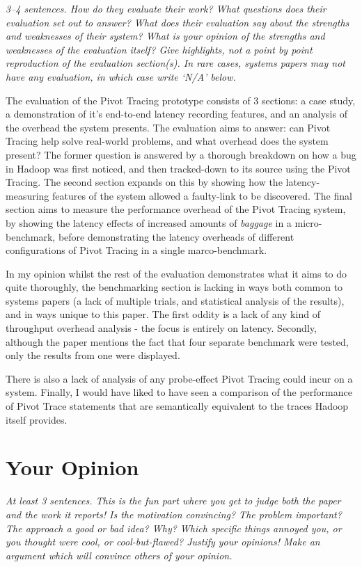 \documentclass[11pt]{article}
\begin{document}
\textsl{3--4 sentences. How do they evaluate their work? What questions does
their evaluation set out to answer? What does their evaluation say about the
strengths and weaknesses of their system? What is your opinion of the strengths
and weaknesses of the evaluation itself? Give highlights, not a point by point
reproduction of the evaluation section(s). In rare cases, systems papers may
not have any evaluation, in which case write `N/A' below.}

The evaluation of the Pivot Tracing prototype consists of 3 sections: a case
study, a demonstration of it's end-to-end latency recording features, and an
analysis of the overhead the system presents. The evaluation aims to answer:
can Pivot Tracing help solve real-world problems, and what overhead does the
system present? The former question is answered by a thorough breakdown on how
a bug in Hadoop was first noticed, and then tracked-down to its source using
the Pivot Tracing. The second section expands on this by showing how the
latency-measuring features of the system allowed a faulty-link to be
discovered. The final section aims to measure the performance overhead of the
Pivot Tracing system, by showing the latency effects of increased amounts of
\textit{baggage} in a micro-benchmark, before demonstrating the latency
overheads of different configurations of Pivot Tracing in a single
marco-benchmark.

In my opinion whilst the rest of the evaluation demonstrates what it aims to do
quite thoroughly, the benchmarking section is lacking in ways both common to
systems papers (a lack of multiple trials, and statistical analysis of the
results), and in ways unique to this paper. The first oddity is a lack of any
kind of throughput overhead analysis - the focus is entirely on latency. Secondly,
although the paper mentions the fact that four separate benchmark were tested,
only the results from one were displayed.

There is also a lack of analysis of any probe-effect Pivot Tracing could incur
on a system. Finally, I would have liked to have seen a comparison of the
performance of Pivot Trace statements that are semantically equivalent to the
traces Hadoop itself provides.


\section*{Your Opinion}

\textsl{At least 3 sentences. This is the fun part where you get to judge both
the paper and the work it reports! Is the motivation convincing? The problem
important? The approach a good or bad idea? Why? Which specific things annoyed
you, or you thought were cool, or cool-but-flawed? Justify your opinions! Make
an argument which will convince others of your opinion.}
\end{document}
